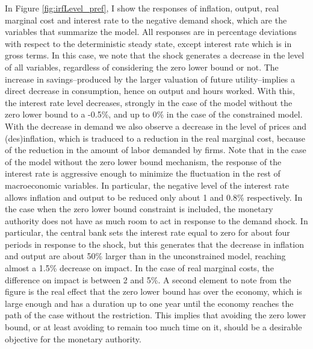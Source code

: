 \documentclass[12pt]{article}
\numberwithin{equation}{section}
\begin{document}
In Figure \ref{fig:irfLevel_pref}, I show the responses of inflation, output, real marginal cost and interest rate to the negative demand shock, which are the variables that summarize the model. All responses are in percentage deviations with respect to the deterministic steady state, except interest rate which is in gross terms. In this case, we note that the shock generates a decrease in the level of all variables, regardless of considering the zero lower bound or not. The increase in savings--produced by the larger valuation of future utility--implies a direct decrease in consumption, hence on output and hours worked. With this, the interest rate level decreases, strongly in the case of the model without the zero lower bound to a -0.5\%, and up to 0\% in the case of the constrained model. With the decrease in demand we also observe a decrease in the level of prices and (des)inflation, which is traduced to a reduction in the real marginal cost, because of the reduction in the amount of labor demanded by firms. Note that in the case of the model without the zero lower bound mechanism, the response of the interest rate is aggressive enough to minimize the fluctuation in the rest of macroeconomic variables. In particular, the negative level of the interest rate allows inflation and output to be reduced only about 1 and 0.8\% respectively. In the case when the zero lower bound constraint is included, the monetary authority does not have as much room to act in response to the demand shock. In particular, the central bank sets the interest rate equal to zero for about four periods in response to the shock, but this generates that the decrease in inflation and output are about 50\% larger than in the unconstrained model, reaching almost a 1.5\% decrease on impact. In the case of real marginal costs, the difference on impact is between 2 and 5\%. A second element to note from the figure is the real effect that the zero lower bound has over the economy, which is large enough and has a duration up to one year until the economy reaches the path of the case without the restriction. This implies that avoiding the zero lower bound, or at least avoiding to remain too much time on it, should be a desirable objective for the monetary authority.

\end{document}
